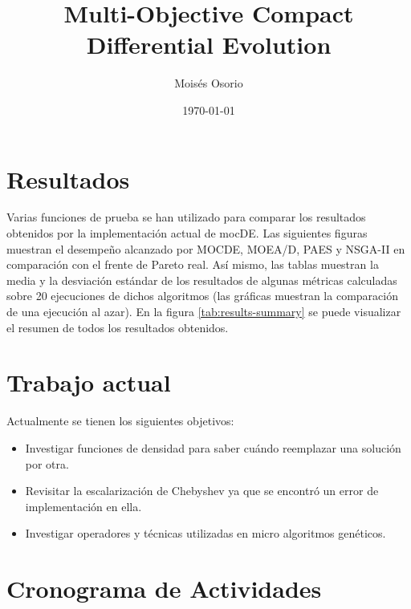 \documentclass[english]{article}
\begin{document}
\makeatletter
\title{Multi-Objective Compact Differential Evolution}
\author{Moisés Osorio}
\date{\today}
\makeatother
\maketitle

\section*{Resultados}

Varias funciones de prueba se han utilizado para comparar los resultados obtenidos por la implementación actual de mocDE. Las siguientes figuras muestran el desempeño alcanzado por MOCDE, MOEA/D, PAES y NSGA-II en comparación con el frente de Pareto real. Así mismo, las tablas muestran la media y la desviación estándar de los resultados de algunas métricas calculadas sobre 20 ejecuciones de dichos algoritmos (las gráficas muestran la comparación de una ejecución al azar). En la figura \ref{tab:results-summary} se puede visualizar el resumen de todos los resultados obtenidos.


\section*{Trabajo actual}

Actualmente se tienen los siguientes objetivos:
\begin{itemize}
\item Investigar funciones de densidad para saber cuándo reemplazar una solución por otra.
\item Revisitar la escalarización de Chebyshev ya que se encontró un error de implementación en ella.
\item Investigar operadores y técnicas utilizadas en micro algoritmos genéticos.
\end{itemize}

\section*{Cronograma de Actividades}
\end{document}
